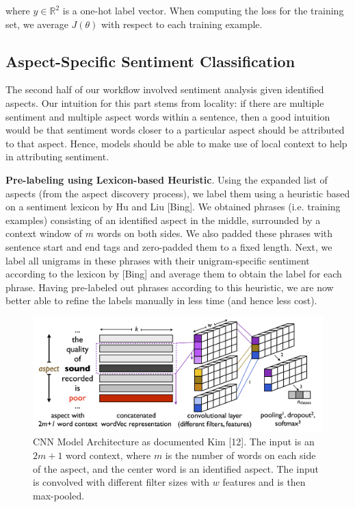 \documentclass{article} %
\begin{document}
where $y \in \mathbb{R}^2$ is a one-hot label vector. When computing the loss for the training set, we average $J(\theta)$ with respect to each training example.

\subsection{Aspect-Specific Sentiment Classification}
The second half of our workflow involved sentiment analysis given identified aspects. Our intuition for this part stems from locality: if there are multiple sentiment and multiple aspect words within a sentence, then a good intuition would be that sentiment words closer to a particular aspect should be attributed to that aspect. Hence, models should be able to make use of local context to help in attributing sentiment.

\textbf{Pre-labeling using Lexicon-based Heuristic}.
Using the expanded list of aspects (from the aspect discovery process), we label them using a heuristic based on a sentiment lexicon by Hu and Liu [Bing]. We obtained phrases (i.e. training examples) consisting of an identified aspect in the middle, surrounded by a context window of $m$ words on both sides. We also padded these phrases with sentence start and end tags and zero-padded them to a fixed length. Next, we label all unigrams in these phrases with their unigram-specific sentiment according to the lexicon by [Bing] and average them to obtain the label for each phrase. Having pre-labeled out phrases according to this heuristic, we are now better able to refine the labels manually in less time (and hence less cost).


\begin{figure}[ht]
\begin{center}
\includegraphics[width=\columnwidth]{model_architecture.png}
\end{center}
\caption{CNN Model Architecture as documented Kim [12]. The input is an $2m+1$ word context, where $m$ is the number of words on each side of the aspect, and the center word is an identified aspect. The input is convolved with different filter sizes with $w$ features and is then max-pooled.}
\label{architecture}
\end{figure}
\end{document}
